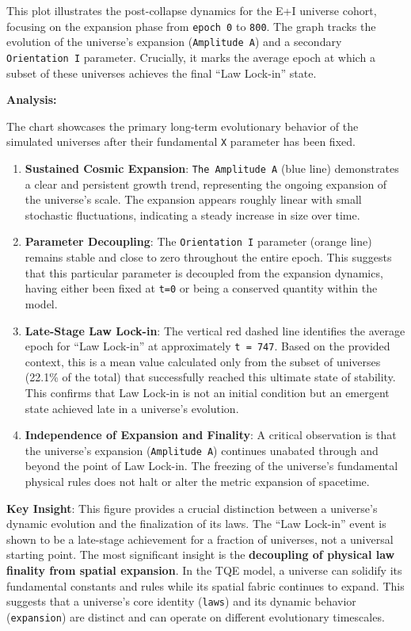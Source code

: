 This plot illustrates the post-collapse dynamics for the E+I universe
cohort, focusing on the expansion phase from \texttt{epoch\ 0} to
\texttt{800}. The graph tracks the evolution of the universe's expansion
(\texttt{Amplitude\ A}) and a secondary \texttt{Orientation\ I}
parameter. Crucially, it marks the average epoch at which a subset of
these universes achieves the final ``Law Lock-in'' state.

\textbf{Analysis:}

The chart showcases the primary long-term evolutionary behavior of the
simulated universes after their fundamental \texttt{X} parameter has
been fixed.

\begin{enumerate}
\def\labelenumi{\arabic{enumi}.}
\item
  \textbf{Sustained Cosmic Expansion}: \texttt{The\ Amplitude\ A} (blue
  line) demonstrates a clear and persistent growth trend, representing
  the ongoing expansion of the universe's scale. The expansion appears
  roughly linear with small stochastic fluctuations, indicating a steady
  increase in size over time.
\item
  \textbf{Parameter Decoupling}: The \texttt{Orientation\ I} parameter
  (orange line) remains stable and close to zero throughout the entire
  epoch. This suggests that this particular parameter is decoupled from
  the expansion dynamics, having either been fixed at \texttt{t=0} or
  being a conserved quantity within the model.
\item
  \textbf{Late-Stage Law Lock-in}: The vertical red dashed line
  identifies the average epoch for ``Law Lock-in'' at approximately
  \texttt{t\ =\ 747}. Based on the provided context, this is a mean
  value calculated only from the subset of universes (22.1\% of the
  total) that successfully reached this ultimate state of stability.
  This confirms that Law Lock-in is not an initial condition but an
  emergent state achieved late in a universe's evolution.
\item
  \textbf{Independence of Expansion and Finality}: A critical
  observation is that the universe's expansion (\texttt{Amplitude\ A})
  continues unabated through and beyond the point of Law Lock-in. The
  freezing of the universe's fundamental physical rules does not halt or
  alter the metric expansion of spacetime.
\end{enumerate}

\textbf{Key Insight}: This figure provides a crucial distinction between
a universe's dynamic evolution and the finalization of its laws. The
``Law Lock-in'' event is shown to be a late-stage achievement for a
fraction of universes, not a universal starting point. The most
significant insight is the \textbf{decoupling of physical law finality
from spatial expansion}. In the TQE model, a universe can solidify its
fundamental constants and rules while its spatial fabric continues to
expand. This suggests that a universe's core identity (\texttt{laws})
and its dynamic behavior (\texttt{expansion}) are distinct and can
operate on different evolutionary timescales.

